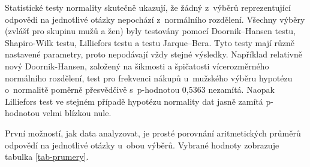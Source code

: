 \documentclass[12pt,twoside,openany]{fithesis}
\begin{document}
                Statistické testy normality skutečně ukazují, že žádný 
z~výběrů reprezentující odpovědi na jednotlivé otázky nepochází 
z~normálního rozdělení. Všechny výběry (zvlášť pro skupinu mužů a 
žen) byly testovány pomocí Doornik--Hansen testu, Shapiro-Wilk testu, 
Lilliefors testu a testu Jarque--Bera. Tyto testy mají různě nastavené 
parametry, proto nepodávají vždy stejné výsledky. Například relativně 
nový Doornik-Hansen, založený na šikmosti a špičatosti vícerozměrného 
normálního rozdělení, test pro frekvenci nákupů u~mužského výběru 
hypotézu o~normalitě poměrně přesvědčivě s~p-hodnotou 0,5363 
nezamítá. \cite{dh-test}{} Naopak Lilliefors test ve stejném případě 
hypotézu normality dat jasně zamítá p-hodnotou velmi blízkou nule.

                První možností, jak data analyzovat, je prosté porovnání 
aritmetických průměrů odpovědí na jednotlivé otázky u~obou výběrů. 
Vybrané hodnoty zobrazuje tabulka \hyperlink{tab-prumery}{\ref{tab-prumery}}.
\end{document}
